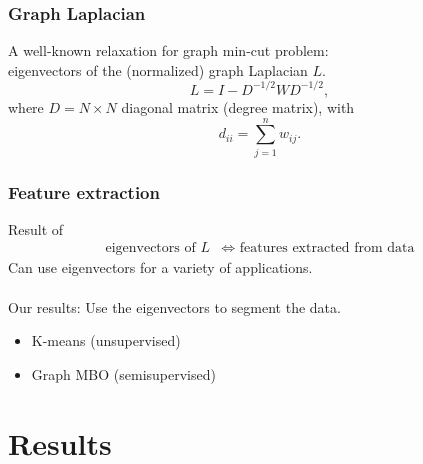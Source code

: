 \documentclass{beamer}
\begin{document}
\begin{frame}
  \frametitle{Graph Laplacian}
  A well-known relaxation for graph min-cut problem: \\
  eigenvectors of the (normalized) graph Laplacian $L$.\\
  \[L = I -D^{-1/2}WD^{-1/2},\]
  where $D = N\times N$ diagonal matrix (degree matrix), with
  \[d_{ii} = \sum_{j=1}^n w_{ij}.\]
\end{frame}

\begin{frame}
  \frametitle{Feature extraction}
  Result of \cite{vonLuxburg07}
  \begin{align*}
    \text{eigenvectors of }L &\iff \text{ features extracted from data}
  \end{align*}
  Can use eigenvectors for a variety of applications. \\~\\
  Our results: Use the eigenvectors to segment the data.
  \begin{itemize}
  \item K-means (unsupervised)
  \item Graph MBO (semisupervised) \cite{Meng2017}
  \end{itemize}
\end{frame}

\section{Results}
\end{document}

